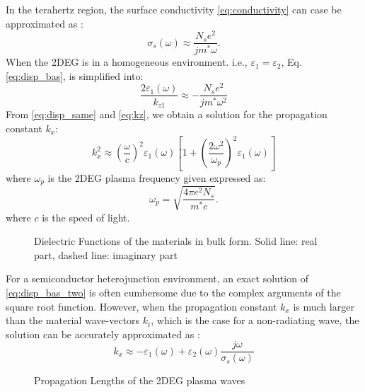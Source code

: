 \documentclass[conference, 10pt]{IEEEtran}
\renewcommand{\O}{\omega}  %
\newcommand{\E}{\varepsilon}  %
\renewcommand{\^}{\hat}  %
\begin{document}
%
In the terahertz region, the surface conductivity \eqref{eq:conductivity} can case be approximated as \cite{stern1967polarizability}:
%
\begin{equation}
  \sigma_s(\O) \approx \frac{N_s e^2}{j m^{\ast}\O}.
  \label{eq:conductivity_app}
\end{equation}
%
When the 2DEG is in a homogeneous environment. i.e., $\E_1 = \E_2$, Eq. \eqref{eq:disp_bas}, is simplified into:
%
\begin{equation}
  \frac{2 \E_1(\O)}{k_{z1}} \approx -\frac{N_s e^2}{j m^{\ast}\O^2}
  \label{eq:disp_same}
\end{equation}
%
From \eqref{eq:disp_same} and \eqref{eq:kz}, we obtain a solution for the propagation constant $k_x$:
%
\begin{equation}
  k_x^2 \approx \left(\frac{\O}{c}\right)^2 \E_1(\O) \left[1 + \left(\frac{2 \O^2}{\O_p}\right)^2 \E_1(\O) \right]
  \label{eq:disp_same_final}
\end{equation}
%
where $\O_p$ is the 2DEG plasma frequency given expressed as:
%
\begin{equation}
  \O_{p} =  \sqrt{\frac{4 \pi e^2 N_s} {m^{\ast} c }}.
  \label{eq:plasma_f}
\end{equation}
%
where $c$ is the speed of light.
\begin{figure*}[!t]
  \centering
  \subfloat[Case A]{
  \label{fig:eps_Ga}}
  \hfil
  \subfloat[Case B]{
  \label{fig:eps_Sto}}
  \caption{Dielectric Functions of the materials in bulk form. Solid line: real part, dashed line: imaginary part}
  \label{fig:eps}
\end{figure*}
%
For a semiconductor heterojunction environment, an exact solution of \eqref{eq:disp_bas_two} is often cumbersome due to the complex arguments of the square root function. However, when the propagation constant $k_x$ is much larger than the material wave-vectors $k_i$, which is the case for a non-radiating wave, the solution can be accurately approximated as \cite{jablan2009plasmonics}:
\begin{equation}
  k_x \approx - {\E_1(\O) + \E_2(\O)} \frac{j \O}{\sigma_s(\O)}
  \label{eq:disp_diff}
\end{equation}
%
\begin{figure*}[!t]
  \centering
  \subfloat[Case A]{
  \label{fig:pl_Ga}}
  \hfil
  \subfloat[Case B]{
  \label{fig:pl_Sto}}
  \caption{Propagation Lengths of the 2DEG plasma waves}
  \label{fig:pl}
\end{figure*}
\end{document}
